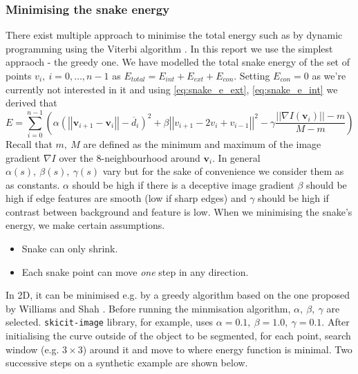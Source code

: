 \documentclass[a4paper]{article}
\begin{document}
\subsubsection{Minimising the snake energy}
There exist multiple approach to minimise the total energy such as by dynamic programming using the Viterbi algorithm \TODO[ref]. In this report we use the simplest appraoch - the greedy one. We have modelled the total snake energy of the set of points $v_i,\ i=0,\ldots,n-1$ as $E_{total} = E_{int} +E_{ext} + E_{con}$. Setting $E_{con}=0$ as we're currently not interested in it and using \eqref{eq:snake_e_ext}, \eqref{eq:snake_e_int} we derived that
\begin{equation}
    E = \sum\limits_{i=0}^{n-1}{\left( \alpha \left( \left|\left|\textbf{v}_{i+1} - \textbf{v}_i\right|\right| -\overline{d}_i \right)^2 +
    \beta\left|\left|  v_{i+1} - 2v_i + v_{i-1} \right|\right|^2 -
    \gamma  \frac{\left| \left| \nabla I (\textbf{v}_i) \right| \right| -m}{M-m}  \right)}
\end{equation}
Recall that $m,\ M$ are defined as the minimum and maximum of the image gradient $\nabla I$ over the 8-neighbourhood around $\textbf{v}_i$. In general $\alpha(s),\ \beta(s),\ \gamma(s)$ vary but for the sake of convenience we consider them as as constants. $\alpha$ should be high if there is a deceptive image gradient $\beta$ should be high if edge features are smooth (low if sharp edges)
and $\gamma$ should be high if contrast between background and feature is low.
  When we minimising the snake's energy, we make certain assumptions.
\begin{itemize}
    \item  Snake can only shrink.
    \item Each snake point can move \textit{one} step in any direction.
\end{itemize}
In 2D, it can be minimised e.g. by a greedy algorithm based on the one proposed by Williams and Shah \TODO[ref]. Before running the minmisation algorithm, $\alpha,\ \beta,\ \gamma$ are selected. \texttt{skicit-image} library, for example, uses $\alpha=0.1,\ \beta=1.0,\ \gamma=0.1$. After initialising the curve outside of the object to be segmented, for each point, search window (e.g. $3\times 3$) around it and move to where energy function is minimal. Two successive steps on a synthetic example are shown below.
\end{document}
